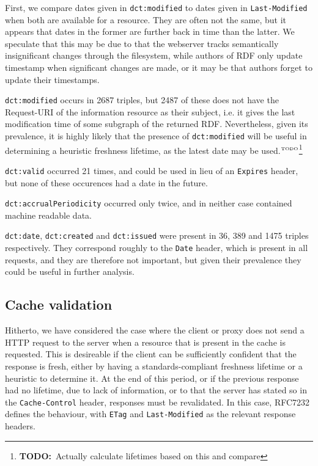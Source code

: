 \documentclass{llncs}
\newcommand{\rdfterm}[1]{\texttt{#1}}
\newcommand{\httph}[1]{\texttt{#1}}
\newcommand{\todo}[1]{\ensuremath{^{\textrm{\tiny{TODO}\normalsize}}}\footnote{\textbf{TODO:}~#1}}
\begin{document}
First, we compare dates given in \rdfterm{dct:modified} to dates given
in \httph{Last-Modified} when both are available for a resource. They
are often not the same, but it appears that dates in the former are
further back in time than the latter. We speculate that this may be
due to that the webserver tracks semantically insignificant changes
through the filesystem, while authors of RDF only update timestamp
when significant changes are made, or it may be that authors forget to
update their timestamps.

\rdfterm{dct:modified} occurs in 2687 triples, but 2487 of these does
not have the Request-URI of the information resource as their subject,
i.e. it gives the last modification time of some subgraph of the
returned RDF. Nevertheless, given its prevalence, it is highly likely
that the presence of \rdfterm{dct:modified} will be useful in
determining a heuristic freshness lifetime, as the latest date may be
used.\todo{Actually calculate lifetimes based on this and compare}

\rdfterm{dct:valid} occurred 21 times, and could be used in lieu of an
\httph{Expires} header, but none of these occurences had a date in the
future.

\rdfterm{dct:accrualPeriodicity} occurred only twice, and in neither
case contained machine readable data.

\rdfterm{dct:date}, \rdfterm{dct:created} and \rdfterm{dct:issued}
were present in 36, 389 and 1475 triples respectively. They correspond
roughly to the \httph{Date} header, which is present in all requests,
and they are therefore not important, but given their prevalence they
could be useful in further analysis.

\subsection{Cache validation}

Hitherto, we have considered the case where the client or proxy does
not send a HTTP request to the server when a resource that is present
in the cache is requested. This is desireable if the client can be
sufficiently confident that the response is fresh, either by having a
standards-compliant freshness lifetime or a heuristic to determine
it. At the end of this period, or if the previous response had no
lifetime, due to lack of information, or to that the server has stated
so in the \httph{Cache-Control} header, responses must be
revalidated. In this case, RFC7232 defines the behaviour, with
\httph{ETag} and \httph{Last-Modified} as the relevant response
headers.
\end{document}
